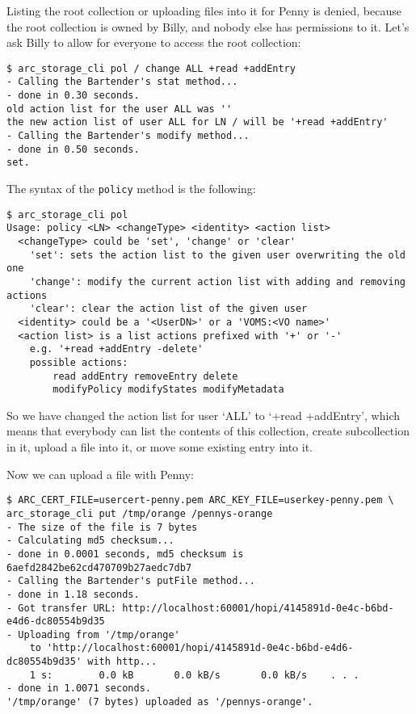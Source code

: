 \documentclass{book}
\begin{document}
Listing the root collection or uploading files into it for Penny is denied, because the root collection is owned by Billy, and nobody else has permissions to it. Let's ask Billy to allow for everyone to access the root collection:

\begin{verbatim}
$ arc_storage_cli pol / change ALL +read +addEntry
- Calling the Bartender's stat method...
- done in 0.30 seconds.
old action list for the user ALL was ''
the new action list of user ALL for LN / will be '+read +addEntry'
- Calling the Bartender's modify method...
- done in 0.50 seconds.
set.
\end{verbatim}

The syntax of the \verb!policy! method is the following:

\begin{verbatim}
$ arc_storage_cli pol
Usage: policy <LN> <changeType> <identity> <action list>
  <changeType> could be 'set', 'change' or 'clear'
    'set': sets the action list to the given user overwriting the old one
    'change': modify the current action list with adding and removing actions
    'clear': clear the action list of the given user
  <identity> could be a '<UserDN>' or a 'VOMS:<VO name>'
  <action list> is a list actions prefixed with '+' or '-'
    e.g. '+read +addEntry -delete'
    possible actions:
        read addEntry removeEntry delete
        modifyPolicy modifyStates modifyMetadata
\end{verbatim}

So we have changed the action list for user `ALL' to `+read +addEntry', which means that everybody can list the contents of this collection, create subcollection in it, upload a file into it, or move some existing entry into it.

Now we can upload a file with Penny:

\begin{verbatim}
$ ARC_CERT_FILE=usercert-penny.pem ARC_KEY_FILE=userkey-penny.pem \
arc_storage_cli put /tmp/orange /pennys-orange
- The size of the file is 7 bytes
- Calculating md5 checksum...
- done in 0.0001 seconds, md5 checksum is 6aefd2842be62cd470709b27aedc7db7
- Calling the Bartender's putFile method...
- done in 1.18 seconds.
- Got transfer URL: http://localhost:60001/hopi/4145891d-0e4c-b6bd-e4d6-dc80554b9d35
- Uploading from '/tmp/orange'
    to 'http://localhost:60001/hopi/4145891d-0e4c-b6bd-e4d6-dc80554b9d35' with http...
    1 s:        0.0 kB       0.0 kB/s       0.0 kB/s    . . .       
- done in 1.0071 seconds.
'/tmp/orange' (7 bytes) uploaded as '/pennys-orange'.
\end{verbatim}
\end{document}
